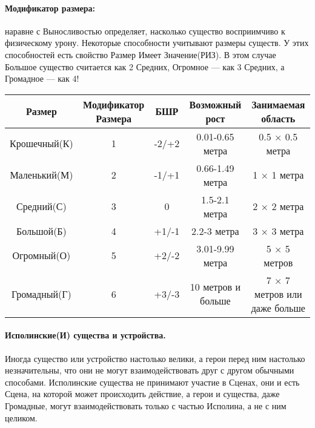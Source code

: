 \paragraph{Модификатор размера:} наравне с Выносливостью определяет, насколько существо восприимчиво к физическому урону. Некоторые способности учитывают размеры существ. У этих способностей есть свойство Размер Имеет Значение(РИЗ). В этом случае Большое существо считается как 2 Средних, Огромное — как 3 Средних, а Громадное — как 4!
\begin{center}
\begin{tabular}{ |c|c|c|c|c| }
\hline
Размер & Модификатор Размера & БШР & Возможный рост & Занимаемая область
\\ \hline
Крошечный(К) & 1 & -2/+2 & 0.01-0.65 метра & 0.5 × 0.5 метра
\\ \hline
Маленький(М) & 2 & -1/+1 & 0.66-1.49 метра & 1 × 1 метра
\\ \hline
Средний(С) & 3 & 0 & 1.5-2.1 метра & 2 × 2 метра
\\ \hline
Большой(Б) & 4 & +1/-1 & 2.2-3 метра & 3 × 3 метра
\\ \hline
Огромный(О) & 5 & +2/-2 & 3.01-9.99 метра & 5 × 5 метров
\\ \hline
Громадный(Г) & 6 & +3/-3 & 10 метров и больше & 7 × 7 метров или даже больше
\\ \hline
\end{tabular}
\end{center}
\paragraph{Исполинские(И) существа и устройства.} Иногда существо или устройство настолько велики, а герои перед ним настолько незначительны, что они не могут взаимодействовать друг с другом обычными способами. Исполинские существа не принимают участие в Сценах, они и есть Сцена, на которой может происходить действие, а герои и существа, даже Громадные, могут взаимодействовать только с частью Исполина, а не с ним целиком.